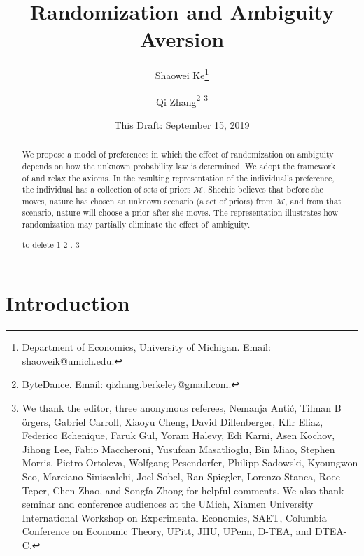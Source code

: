 \documentclass[12pt, notitlepage]{article}
\begin{document}
\title{Randomization and Ambiguity Aversion}
\date{This Draft: September 15, 2019}
\author{Shaowei Ke\thanks{%
Department of Economics, University of Michigan. Email: shaoweik@umich.edu.}
\and Qi Zhang\thanks{%
ByteDance. Email: qizhang.berkeley@gmail.com.} \thanks{%
We thank the editor, three anonymous referees, Nemanja Anti\'{c}, Tilman B%
\"{o}rgers, Gabriel Carroll, Xiaoyu Cheng, David Dillenberger, Kfir Eliaz,
Federico Echenique, Faruk Gul, Yoram Halevy, Edi Karni, Asen Kochov, Jihong
Lee, Fabio Maccheroni, Yusufcan Masatlioglu, Bin Miao, Stephen Morris,
Pietro Ortoleva, Wolfgang Pesendorfer, Philipp Sadowski, Kyoungwon Seo,
Marciano Siniscalchi, Joel Sobel, Ran Spiegler, Lorenzo Stanca, Roee Teper,
Chen Zhao, and Songfa Zhong for helpful comments. We also thank seminar and
conference audiences at the UMich, Xiamen University International Workshop
on Experimental Economics, SAET, Columbia Conference on Economic Theory,
UPitt, JHU, UPenn, D-TEA, and DTEA-C.}}
\maketitle

\begin{abstract}
We propose a model of preferences in which the effect of randomization on
ambiguity depends on how the unknown probability law is determined. We adopt
the framework of \cite{AA63} and relax the axioms. In the resulting
representation of the individual's preference, the individual has a
collection of sets of priors $\mathcal{M}$. Shechic believes that before she
moves, nature has chosen an unknown scenario (a set of priors) from $%
\mathcal{M}$, and from that scenario, nature will choose a prior after she
moves. The representation illustrates how randomization may partially
eliminate the effect of\ ambiguity. 

to delete 1 \citet{Nobody06} 2 \citep{Nobody06}. 3 \cite{Nobody06}

\end{abstract}

\vskip1cm

\thispagestyle{empty}

\clearpage

\setcounter{page}{1}

\section{Introduction}
\end{document}
